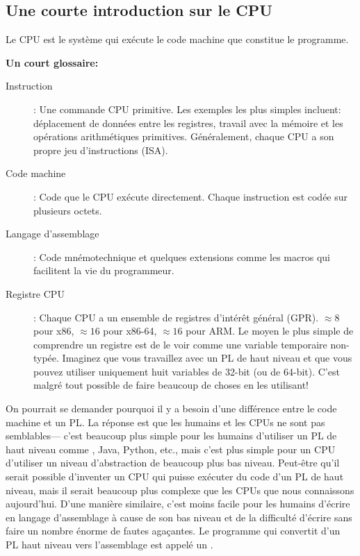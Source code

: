 \subsection{Une courte introduction sur le CPU}

Le \ac{CPU} est le système qui exécute le code machine que constitue le programme.

\textbf{Un court glossaire:}

\begin{description}
\item[Instruction]: Une commande \ac{CPU} primitive.
Les exemples les plus simples incluent: déplacement de données entre les registres, travail avec la mémoire et les opérations arithmétiques primitives.
Généralement, chaque \ac{CPU} a son propre jeu d'instructions (\ac{ISA}).

\item[Code machine]: Code que le \ac{CPU} exécute directement. 
Chaque instruction est codée sur plusieurs octets.
\item[Langage d'assemblage]: Code mnémotechnique et quelques extensions comme les macros qui facilitent la vie du programmeur.
\item[Registre CPU]: Chaque \ac{CPU} a un ensemble de registres d'intérêt général (\ac{GPR}).
$\approx 8$ pour x86, $\approx 16$ pour x86-64, $\approx 16$ pour ARM.
Le moyen le plus simple de comprendre un registre est de le voir comme une variable temporaire non-typée.
Imaginez que vous travaillez avec un \ac{PL} de haut niveau et que vous pouvez utiliser uniquement huit variables de 32-bit (ou de 64-bit).
C'est malgré tout possible de faire beaucoup de choses en les utilisant!
\end{description}


On pourrait se demander pourquoi il y a besoin d'une différence entre le code machine et un \ac{PL}. La réponse est que les humains et les \ac{CPU}s ne sont pas semblables---%
c'est beaucoup plus simple pour les humains d'utiliser un \ac{PL} de haut niveau comme \CCpp, Java, Python, etc., mais c'est plus simple pour un \ac{CPU} d'utiliser un niveau d'abstraction de beaucoup plus bas niveau.
Peut-être qu'il serait possible d'inventer un \ac{CPU} qui puisse exécuter du code d'un \ac{PL} de haut niveau, mais il serait beaucoup plus complexe que les \ac{CPU}s que nous connaissons aujourd'hui.
D'une manière similaire, c'est moins facile pour les humains d'écrire en langage d'assemblage à cause de son bas niveau et de la difficulté d'écrire sans faire un nombre énorme de fautes agaçantes.
Le programme qui convertit d'un \ac{PL} haut niveau vers l'assemblage est appelé un .

